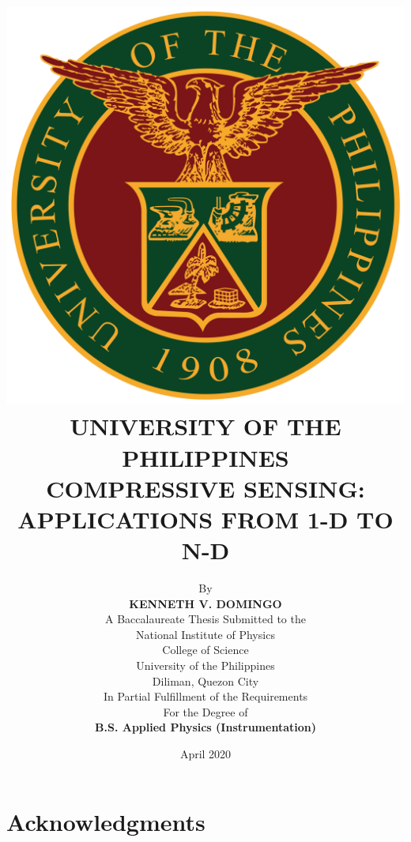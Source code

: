 \documentclass[12pt,oneside]{report}
\begin{document}

\title{
{\includegraphics[scale=0.15]{updlogo.png}} \\
{\normalsize UNIVERSITY OF THE PHILIPPINES} \\ \bigskip
{\bf COMPRESSIVE SENSING: APPLICATIONS FROM 1-D TO N-D}
}

\author{
{By} \\ \bigskip
{\bf KENNETH V. DOMINGO} \\ \bigskip
{\rm A Baccalaureate Thesis Submitted to the} \\
{\rm National Institute of Physics} \\
{\rm College of Science} \\
{\rm University of the Philippines} \\
{\rm Diliman, Quezon City} \\ \bigskip
{\rm In Partial Fulfillment of the Requirements} \\
{\rm For the Degree of} \\
{\bf B.S. Applied Physics (Instrumentation)}
}
\date{\normalsize April 2020}
\maketitle
\thispagestyle{titlestyle}

\chapter*{Acknowledgments}
\end{document}
